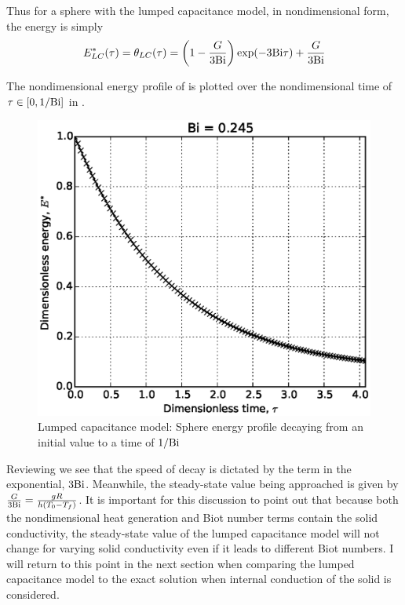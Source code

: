 Thus for a sphere with the lumped capacitance model, in nondimensional form, the energy is simply
\begin{equation}\label{eq:lc-energy-profile}
	E^*_{LC}(\tau) = \theta_{LC}(\tau) = \left(1-\frac{G}{3\mathrm{Bi}}\right)\exp(-3\mathrm{Bi} \tau) + \frac{G}{3\mathrm{Bi}}
\end{equation}

The nondimensional energy profile of  is plotted over the nondimensional time of $\tau \in [0,1/\mathrm{Bi}]$ in . 

\begin{figure}[ht]
	\centering
		\includegraphics[width=\singleimagewidth]{figures/LC-sphere-in-fluid}
	\caption[Lumped Capacitance energy profile]{Lumped capacitance model: Sphere energy profile decaying from an initial value to a time of $1/\mathrm{Bi}$}
	\label{fig:LC-sphere-in-fluid}
\end{figure}

Reviewing  we see that the speed of decay is dictated by the term in the exponential, $3\mathrm{Bi}$. Meanwhile, the steady-state value being approached is given by $\frac{G}{3\mathrm{Bi}} = \frac{gR}{h(T_0 - T_f)}$. It is important for this discussion to point out that because both the nondimensional heat generation and Biot number terms contain the solid conductivity, the steady-state value of the lumped capacitance model will not change for varying solid conductivity even if it leads to different Biot numbers. I will return to this point in the next section when comparing the lumped capacitance model to the exact solution when internal conduction of the solid is considered.



